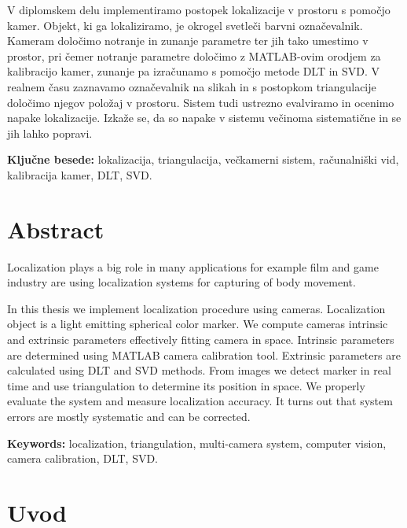\documentclass[a4paper, 12pt]{book}
\newcommand{\tkeywords}{lokalizacija, triangulacija, večkamerni sistem, računalniški vid, kalibracija kamer, DLT, SVD}
\newcommand{\tkeywordsEn}{localization, triangulation, multi-camera system, computer vision, camera calibration, DLT, SVD}
\newcommand{\clearemptydoublepage}{\newpage{\pagestyle{empty}\cleardoublepage}}
\begin{document}
V diplomskem delu implementiramo postopek lokalizacije v prostoru s pomočjo kamer. Objekt, ki ga lokaliziramo, je okrogel svetleči barvni označevalnik. Kameram določimo notranje in zunanje parametre ter jih tako umestimo v prostor, pri čemer notranje parametre določimo z MATLAB-ovim orodjem za kalibracijo kamer, zunanje pa izračunamo s pomočjo metode DLT in SVD. V realnem času zaznavamo označevalnik na slikah in s postopkom triangulacije določimo njegov položaj v prostoru. Sistem tudi ustrezno evalviramo in ocenimo napake lokalizacije. Izkaže se, da so napake v sistemu večinoma sistematične in se jih lahko popravi.
\bigskip

\noindent\textbf{Ključne besede:} \tkeywords.
\clearemptydoublepage

\chapter*{Abstract}
Localization plays a big role in many applications for example film and game industry are using localization systems for capturing of body movement.

In this thesis we implement localization procedure using cameras. Localization object is a light emitting spherical color marker. We compute cameras intrinsic and extrinsic parameters effectively fitting camera in space. Intrinsic parameters are determined using MATLAB camera calibration tool. Extrinsic parameters are calculated using DLT and SVD methods. From images we detect marker in real time and use triangulation to determine its position in space. We properly evaluate the system and measure localization accuracy. It turns out that system errors are mostly systematic and can be corrected.
\bigskip

\noindent\textbf{Keywords:} \tkeywordsEn.
\clearemptydoublepage

\mainmatter
\setcounter{page}{1}
\pagestyle{fancy}

\chapter{Uvod}
\end{document}
